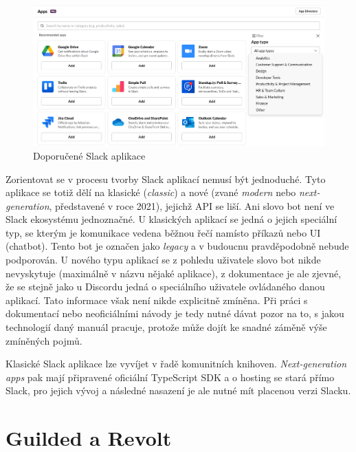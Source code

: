 \documentclass[FM]{tulthesis}
\begin{document}
	\begin{figure}[ht]
		\centering
		\includegraphics[width=\textwidth]{img/SlackApps}
		\caption{Doporučené Slack aplikace}
	\end{figure}
	
	Zorientovat se v procesu tvorby Slack aplikací nemusí být jednoduché. Tyto aplikace se totiž dělí na klasické (\textit{classic}) a nové (zvané \textit{modern} nebo \textit{next-generation}, představené v roce 2021), jejichž API se liší. Ani slovo bot není ve Slack ekosystému jednoznačné. U klasických aplikací se jedná o jejich speciální typ, se kterým je komunikace vedena běžnou řečí namísto příkazů nebo UI (chatbot). Tento bot je označen jako \textit{legacy} a v budoucnu pravděpodobně nebude podporován. U nového typu aplikací se z pohledu uživatele slovo bot nikde nevyskytuje (maximálně v názvu nějaké aplikace), z dokumentace je ale zjevné, že se stejně jako u Discordu jedná o speciálního uživatele ovládaného danou aplikací. Tato informace však není nikde explicitně zmíněna. Při práci s dokumentací nebo neoficiálními návody je tedy nutné dávat pozor na to, s jakou technologií daný manuál pracuje, protože může dojít ke snadné záměně výše zmíněných pojmů.
	
	Klasické Slack aplikace lze vyvíjet v řadě komunitních knihoven. \textit{Next-generation apps} pak mají připravené oficiální \mbox{TypeScript} SDK a o hosting se stará přímo Slack, pro jejich vývoj a následné nasazení je ale nutné mít placenou verzi Slacku.
	
	\section{Guilded a Revolt}
	
\end{document}
